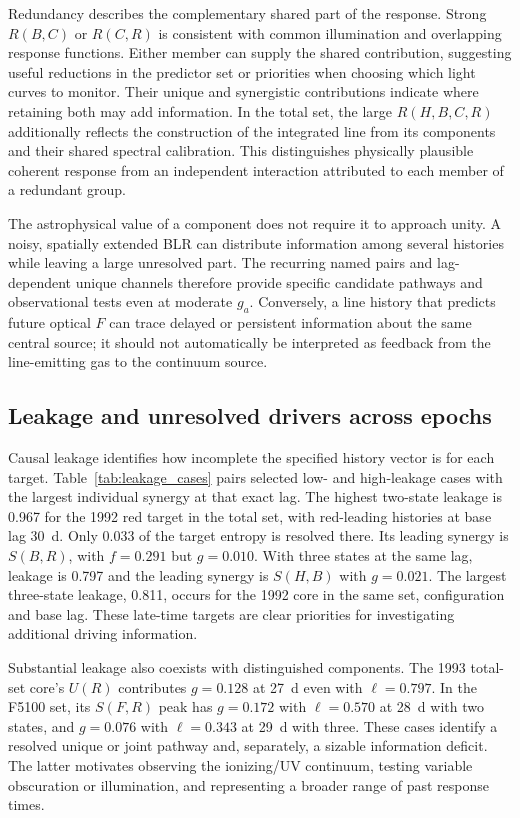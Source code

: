 \documentclass[fleqn,usenatbib]{mnras}
\begin{document}
Redundancy describes the complementary shared part of the response. Strong $R(B,C)$ or $R(C,R)$ is consistent with common illumination and overlapping response functions. Either member can supply the shared contribution, suggesting useful reductions in the predictor set or priorities when choosing which light curves to monitor. Their unique and synergistic contributions indicate where retaining both may add information. In the total set, the large $R(H,B,C,R)$ additionally reflects the construction of the integrated line from its components and their shared spectral calibration. This distinguishes physically plausible coherent response from an independent interaction attributed to each member of a redundant group.

The astrophysical value of a component does not require it to approach unity. A noisy, spatially extended BLR can distribute information among several histories while leaving a large unresolved part. The recurring named pairs and lag-dependent unique channels therefore provide specific candidate pathways and observational tests even at moderate $g_a$. Conversely, a line history that predicts future optical $F$ can trace delayed or persistent information about the same central source; it should not automatically be interpreted as feedback from the line-emitting gas to the continuum source.

\subsection{Leakage and unresolved drivers across epochs}
\label{sec:sensitivity}
Causal leakage identifies how incomplete the specified history vector is for each target. Table~\ref{tab:leakage_cases} pairs selected low- and high-leakage cases with the largest individual synergy at that exact lag. The highest two-state leakage is 0.967 for the 1992 red target in the total set, with red-leading histories at base lag 30~d. Only 0.033 of the target entropy is resolved there. Its leading synergy is $S(B,R)$, with $f=0.291$ but $g=0.010$. With three states at the same lag, leakage is 0.797 and the leading synergy is $S(H,B)$ with $g=0.021$. The largest three-state leakage, 0.811, occurs for the 1992 core in the same set, configuration and base lag. These late-time targets are clear priorities for investigating additional driving information.

Substantial leakage also coexists with distinguished components. The 1993 total-set core's $U(R)$ contributes $g=0.128$ at 27~d even with $\ell=0.797$. In the F5100 set, its $S(F,R)$ peak has $g=0.172$ with $\ell=0.570$ at 28~d with two states, and $g=0.076$ with $\ell=0.343$ at 29~d with three. These cases identify a resolved unique or joint pathway and, separately, a sizable information deficit. The latter motivates observing the ionizing/UV continuum, testing variable obscuration or illumination, and representing a broader range of past response times.
\end{document}
